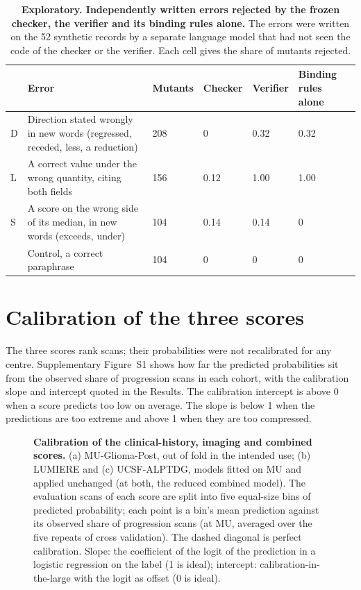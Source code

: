 \documentclass[11pt,a4paper]{article}
\begin{document}
\begin{table}[!htbp]
\renewcommand{\thetable}{S16}\renewcommand{\theHtable}{S16}
\centering
\caption{\textbf{Exploratory. Independently written errors rejected by the frozen checker, the verifier and its
binding rules alone.} The errors were written on the 52 synthetic records by a separate language model that had not seen the code of
the checker or the verifier. Each cell gives the share of mutants rejected.}
\label{tab:S26g}
\footnotesize
\begin{tabularx}{\linewidth}{@{}R{0.4cm}LR{1.2cm}R{1.2cm}R{1.2cm}R{1.4cm}@{}}
\toprule
 & Error & Mutants & Checker & Verifier & Binding rules alone \\
\midrule
D & Direction stated wrongly in new words (regressed, receded, less, a reduction) & 208 & 0 & 0.32 & 0.32 \\
L & A correct value under the wrong quantity, citing both fields & 156 & 0.12 & 1.00 & 1.00 \\
S & A score on the wrong side of its median, in new words (exceeds, under) & 104 & 0.14 & 0.14 & 0 \\
& Control, a correct paraphrase & 104 & 0 & 0 & 0 \\
\bottomrule
\end{tabularx}
\end{table}

\FloatBarrier
\section{Calibration of the three scores}\label{sec:S27}

The three scores rank scans; their probabilities were not recalibrated for any centre. Supplementary
Figure~S1 shows how far the predicted probabilities sit from the observed share of progression scans in each
cohort, with the calibration slope and intercept quoted in the Results. The calibration intercept is above 0 when a
score predicts too low on average. The slope is below 1 when the predictions are too extreme and above 1 when they
are too compressed.

\begin{figure}[!htbp]
\renewcommand{\thefigure}{S1}\renewcommand{\theHfigure}{S1}
\centering
{}
\caption{\textbf{Calibration of the clinical-history, imaging and combined scores.} (a) MU-Glioma-Post, out of fold
in the intended use; (b) LUMIERE and (c) UCSF-ALPTDG, models fitted on MU and applied unchanged (at both, the reduced
combined model). The evaluation scans of each score are split into five equal-size bins of predicted probability;
each point is a bin's mean prediction against its observed share of progression scans (at MU, averaged over the five
repeats of cross validation). The dashed diagonal is perfect calibration. Slope: the coefficient of the logit of
the prediction in a logistic regression on the label (1 is ideal); intercept: calibration-in-the-large with the
logit as offset (0 is ideal).}
\label{fig:S_calibration}
\end{figure}
\end{document}
